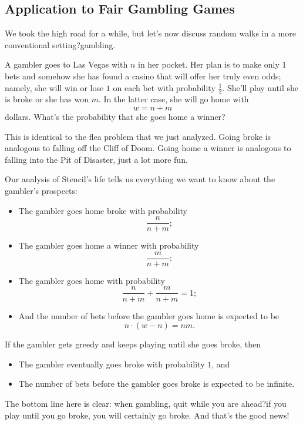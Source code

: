 \documentclass[12pt,a4paper]{article}
\begin{document}
		
		\subsection{Application to Fair Gambling Games}
		
		We took the high road for a while, but let's now discuss random walks in a more conventional setting?gambling.
		
		A gambler goes to Las Vegas with $n$ in her pocket. 
		Her plan is to make only $1$ bets and somehow she has found a casino that will offer her truly even odds; namely, she will win or lose $1$ on each bet with probability $\frac{1}{2}$. She'll play until she is broke or she has won $m$. In the latter case, she will go home with
		$$
		w = n + m
		$$
		dollars. What's the probability that she goes home a winner?
		
		This is identical to the flea problem that we just analyzed. Going broke is analogous to falling off the Cliff of Doom. Going home a winner is analogous to falling into the Pit of Disaster, just a lot more fun.
		
		Our analysis of Stencil's life tells us everything we want to know about the gambler's prospects:
		\begin{itemize}
			\item The gambler goes home broke with probability
			$$
			\frac{n}{n + m};
			$$
			\item The gambler goes home a winner with probability
			$$
			\frac{m}{n + m};
			$$
			\item The gambler goes home with probability
			$$
			\frac{n}{n + m} + \frac{m}{n + m} = 1;
			$$
			\item And the number of bets before the gambler goes home is expected to be
			$$
			n \cdot (w - n) = nm.
			$$
		\end{itemize}
		
		If the gambler gets greedy and keeps playing until she goes broke, then
		\begin{itemize}
			\item The gambler eventually goes broke with probability $1$, and
			\item The number of bets before the gambler goes broke is expected to be infinite.
		\end{itemize}
		
		The bottom line here is clear: when gambling, quit while you are ahead?if you play until you go broke, you will certainly go broke. And that's the good news!
		
\end{document}
